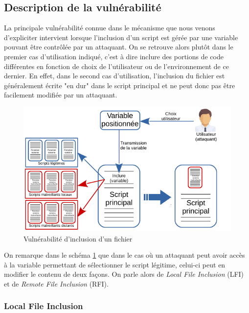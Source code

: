 \subsection{Description de la vulnérabilité}

La principale vulnérabilité connue dans le mécanisme que nous venons d'expliciter intervient lorsque l'inclusion d'un script est gérée par une variable pouvant être contrôlée par un attaquant. On se retrouve alors plutôt dans le premier cas d'utilisation indiqué, c'est à dire inclure des portions de code différentes en fonction de choix de l'utilisateur ou de l'environnement de ce dernier. En effet, dans le second cas d'utilisation, l'inclusion du fichier est généralement écrite "en dur" dans le script principal et ne peut donc pas être facilement modifiée par un attaquant.

\begin{figure}[!h]
\begin{center}


\includegraphics[scale=1.4]{images/include_hacked.pdf}

\caption{Vulnérabilité d'inclusion d'un fichier}
\label{inclusion_hacked}
\end{center}
\end{figure}

On remarque dans le schéma \ref{inclusion_hacked} que dans le cas où un attaquant peut avoir accès à la variable permettant de sélectionner le script légitime, celui-ci peut en modifier le contenu de deux façons. On parle alors de \textit{Local File Inclusion} (LFI) et de \textit{Remote File Inclusion} (RFI).

\subsubsection{Local File Inclusion}

